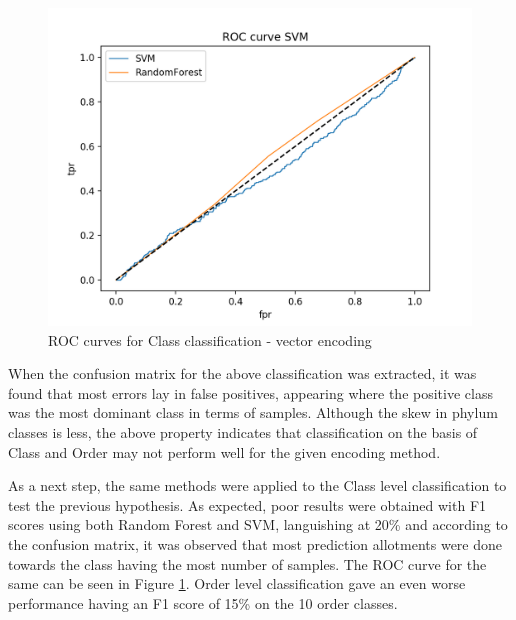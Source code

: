 \documentclass[12pt]{article}
\begin{document}
        \begin{figure}[h]
        \centering
        \includegraphics[scale=0.5]{svmrf_roc.png}
        \caption{ROC curves for Class classification - vector encoding}
        \label{fig:class_svm}
        \end{figure}

        When the confusion matrix for the above classification was extracted, it was found that most errors lay in false positives, appearing where the positive class was the most dominant class in terms of samples. Although the skew in phylum classes is less, the above property indicates that classification on the basis of Class and Order may not perform well for the given encoding method.

        As a next step, the same methods were applied to the Class level classification to test the previous hypothesis. As expected, poor results were obtained with F1 scores using both Random Forest and SVM, languishing at 20\% and according to the confusion matrix, it was observed that most prediction allotments were done towards the class having the most number of samples. The ROC curve for the same can be seen in Figure \ref{fig:class_svm}.
        \newline
        Order level classification gave an even worse performance having an F1 score of 15\% on the 10 order classes.
\end{document}
